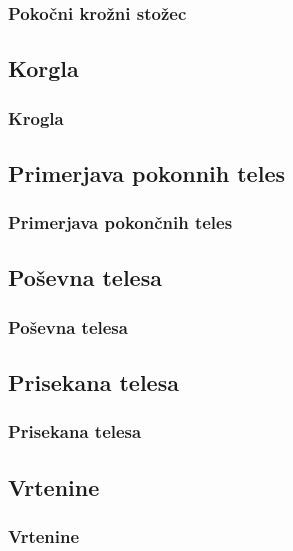         \begin{frame}
            \frametitle{Pokočni krožni stožec}
        \end{frame}

    \subsection{Korgla}

        \begin{frame}
            \frametitle{Krogla}
        \end{frame}

    \subsection{Primerjava pokonnih teles}

        \begin{frame}
            \frametitle{Primerjava pokončnih teles}
        \end{frame}

    \subsection{Poševna telesa}

        \begin{frame}
            \frametitle{Poševna telesa}
        \end{frame}

    \subsection{Prisekana telesa}

        \begin{frame}
            \frametitle{Prisekana telesa}
        \end{frame}

    \subsection{Vrtenine}
        
        \begin{frame}
            \frametitle{Vrtenine}
        \end{frame}